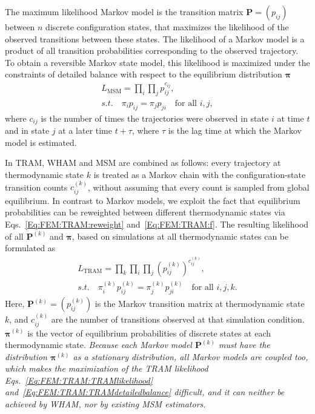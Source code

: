 The maximum likelihood Markov model is the transition matrix $\mathbf{P}=(p_{ij})$ between $n$ discrete configuration states, that maximizes the likelihood of the observed transitions between these states. The likelihood of a Markov model is a product of all transition probabilities corresponding to the observed trajectory. To obtain a reversible Markov state model, this likelihood is maximized under the constraints of detailed balance with respect to the equilibrium distribution $\boldsymbol{\pi}$
\begin{align}
    L_{\mathrm{MSM}}=\prod_i\prod_j p_{ij}^{c_{ij}},\\
    s.t.\quad \pi_i p_{ij}=\pi_j p_{ji} \quad \text{for all } i,j,
\end{align}
where $c_{ij}$ is the number of times the trajectories were observed in state $i$ at time $t$ and in state $j$ at a later time $t+\tau$, where $\tau$ is the lag time at which the Markov model is estimated.

In TRAM, WHAM and MSM are combined as follows: every trajectory at thermodynamic state $k$ is treated as a Markov chain with the configuration-state transition counts $c_{ij}^{(k)}$, without assuming that every count is sampled from global equilibrium. In contrast to Markov models, we exploit the fact that equilibrium probabilities can be reweighted between different thermodynamic states via Eqs.~\ref{Eq:FEM:TRAM:reweight} and~\ref{Eq:FEM:TRAM:f}. The resulting likelihood of all $\mathbf{P}^{(k)}$ and $\boldsymbol{\pi}$, based on simulations at all thermodynamic states can be formulated as
\begin{align}
	L_{\mathrm{TRAM}}=\prod_k\prod_i\prod_j (p_{ij}^{(k)})^{c_{ij}^{(k)}},\label{Eq:FEM:TRAM:TRAMlikelihood}\\
	s.t.\quad \pi_i^{(k)}p_{ij}^{(k)}=\pi_j^{(k)}p_{ji}^{(k)}\quad \text{for all }i,j,k. \label{Eq:FEM:TRAM:TRAMdetailedbalance}
\end{align}
Here, $\mathbf{P}^{(k)}=(p_{ij}^{(k)})$ is the Markov transition matrix at thermodynamic state $k$, and $c_{ij}^{(k)}$ are the number of transitions observed at that simulation condition. $\boldsymbol{\pi}^{(k)}$ is the vector of equilibrium probabilities of discrete states at each thermodynamic state. \emph{Because each Markov model $\mathbf{P}^{(k)}$ must have the distribution $\boldsymbol{\pi}^{(k)}$ as a stationary distribution, all Markov models are coupled too, which makes the maximization of the TRAM likelihood Eqs.~\ref{Eq:FEM:TRAM:TRAMlikelihood} and~\ref{Eq:FEM:TRAM:TRAMdetailedbalance} difficult, and it can neither be achieved by WHAM, nor by existing MSM estimators.}


